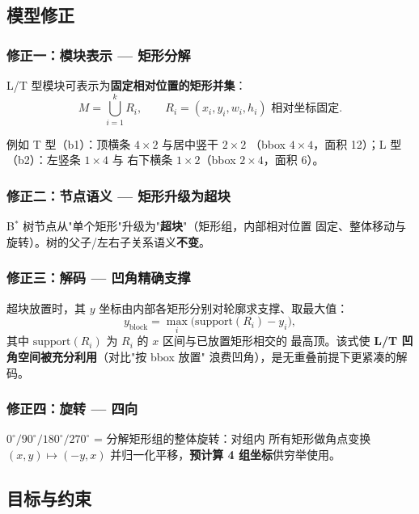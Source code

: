 \documentclass[12pt,a4paper]{article}
\begin{document}
\subsection{模型修正}

\subsubsection{修正一：模块表示 --- 矩形分解}

L/T 型模块可表示为\textbf{固定相对位置的矩形并集}：
\begin{equation}
M = \bigcup_{i=1}^{k} R_i, \qquad
R_i = (x_i, y_i, w_i, h_i) \text{ 相对坐标固定}.
\end{equation}

例如 T 型（b1）：顶横条 $4\times2$ 与居中竖干 $2\times2$
（bbox $4\times4$，面积 12）；L 型（b2）：左竖条 $1\times4$ 与
右下横条 $1\times2$（bbox $2\times4$，面积 6）。

\subsubsection{修正二：节点语义 --- 矩形升级为超块}

B$^*$ 树节点从"单个矩形"升级为"\textbf{超块}"（矩形组，内部相对位置
固定、整体移动与旋转）。树的父子/左右子关系语义\textbf{不变}。

\subsubsection{修正三：解码 --- 凹角精确支撑}

超块放置时，其 $y$ 坐标由内部各矩形分别对轮廓求支撑、取最大值：
\begin{equation}
\label{eq:support}
y_{\text{block}} = \max_{i} \big( \text{support}(R_i) - y_i \big),
\end{equation}
其中 $\text{support}(R_i)$ 为 $R_i$ 的 $x$ 区间与已放置矩形相交的
最高顶。该式使 \textbf{L/T 凹角空间被充分利用}（对比"按 bbox 放置"
浪费凹角），是无重叠前提下更紧凑的解码。

\subsubsection{修正四：旋转 --- 四向}

$0^\circ/90^\circ/180^\circ/270^\circ$ = 分解矩形组的整体旋转：对组内
所有矩形做角点变换 $(x, y) \mapsto (-y, x)$ 并归一化平移，\textbf{预计算
4 组坐标}供穷举使用。

\subsection{目标与约束}
\end{document}
